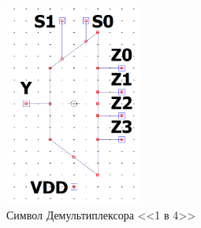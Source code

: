 \begin{figure}[H]
	\centering
	\includegraphics[width=0.4\textwidth]{../data/demux}
	\caption{Символ Демультиплексора <<1 в 4>>}
\end{figure}
